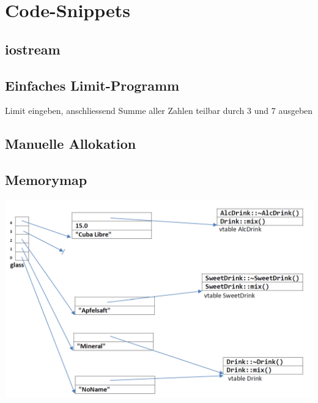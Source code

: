 \section{Code-Snippets}

\subsection{iostream}
    

\subsection{Einfaches Limit-Programm}
    Limit eingeben, anschliessend Summe aller Zahlen teilbar durch 3 und 7 ausgeben
    

\subsection{Manuelle Allokation}\label{Manuelle Allokation}
    



\subsection{Memorymap}
    
    \nextcol
    
    

    \begin{center}
        \includegraphics[width=\columnwidth]{pictures/memorymap-drink.png}  
    \end{center}
    \nextcol

